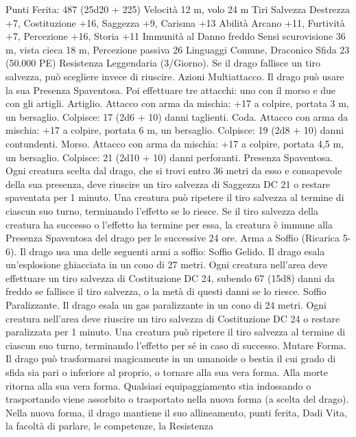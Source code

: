 \begin{multicols}{2}
\hspace*{0pt}\hfill{Punti Ferita}: 487 (25d20 + 225)
Velocità 12 m, volo 24 m
Tiri Salvezza Destrezza +7, Costituzione +16, Saggezza +9,
Carisma +13
Abilità Arcano +11, Furtività +7, Percezione +16, Storia +11
Immunità al Danno freddo
Sensi scurovisione 36 m, vista cieca 18 m, Percezione passiva 26
Linguaggi Comune, Draconico
Sfida 23 (50.000 PE)
Resistenza Leggendaria (3/Giorno). Se il drago fallisce un tiro
salvezza, può scegliere invece di riuscire.
Azioni
Multiattacco. Il drago può usare la sua Presenza Spaventosa. Poi
effettuare tre attacchi: uno con il morso e due con gli artigli.
Artiglio. Attacco con arma da mischia: +17 a colpire, portata 3
m, un bersaglio.
Colpisce: 17 (2d6 + 10) danni taglienti.
Coda. Attacco con arma da mischia: +17 a colpire, portata 6 m,
un bersaglio.
Colpisce: 19 (2d8 + 10) danni contundenti.
Morso. Attacco con arma da mischia: +17 a colpire, portata 4,5
m, un bersaglio.
Colpisce: 21 (2d10 + 10) danni perforanti.
Presenza Spaventosa. Ogni creatura scelta dal drago, che si trovi
entro 36 metri da esso e consapevole della sua presenza, deve
riuscire un tiro salvezza di Saggezza DC 21 o restare spaventata per
1 minuto. Una creatura può ripetere il tiro salvezza al termine di
ciascun suo turno, terminando l’effetto se lo riesce. Se il tiro salvezza
della creatura ha successo o l’effetto ha termine per essa, la creatura è
immune alla Presenza Spaventosa del drago per le successive 24 ore.
Arma a Soffio (Ricarica 5-6). Il drago usa una delle seguenti armi
a soffio:
Soffio Gelido. Il drago esala un’esplosione ghiacciata in un cono di
27 metri. Ogni creatura nell’area deve effettuare un tiro salvezza di
Costituzione DC 24, subendo 67 (15d8) danni da freddo se fallisce il
tiro salvezza, o la metà di questi danni se lo riesce.
Soffio Paralizzante. Il drago esala un gas paralizzante in un cono di
24 metri. Ogni creatura nell’area deve riuscire un tiro salvezza di
Costituzione DC 24 o restare paralizzata per 1 minuto. Una creatura
può ripetere il tiro salvezza al termine di ciascun suo turno,
terminando l’effetto per sé in caso di successo.
Mutare Forma. Il drago può trasformarsi magicamente in un
umanoide o bestia il cui grado di sfida sia pari o inferiore al proprio,
o tornare alla sua vera forma. Alla morte ritorna alla sua vera forma.
Qualsiasi equipaggiamento stia indossando o trasportando viene
assorbito o trasportato nella nuova forma (a scelta del drago).
Nella nuova forma, il drago mantiene il suo allineamento, punti
ferita, Dadi Vita, la facoltà di parlare, le competenze, la Resistenza

\end{multicols}

